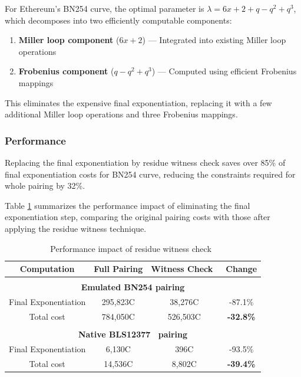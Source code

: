 For Ethereum's BN254 curve, the optimal parameter is $\lambda = 6x + 2 + q - q^2 + q^3$, which decomposes into two efficiently computable components:

\begin{enumerate}
\item \textbf{Miller loop component} ($6x + 2$) --- Integrated into existing Miller loop operations
\item \textbf{Frobenius component} ($q - q^2 + q^3$) --- Computed using efficient Frobenius mappings
\end{enumerate}

This eliminates the expensive final exponentiation, replacing it with a few additional Miller loop operations and three Frobenius mappings.

\subsubsection{Performance}

Replacing the final exponentiation by residue witness check saves over 85\% of final exponentiation costs for BN254 curve, reducing the constraints required for whole pairing by 32\%.

Table \ref{tab:pairing_performance} summarizes the performance impact of eliminating the final exponentiation step, comparing the original pairing costs with those after applying the residue witness technique.

\begin{table}[h]
\centering
\caption{Performance impact of residue witness check~\cite{OPP24}}
\label{tab:pairing_performance}
\begin{tabular}{|c|c|c|c|}
\hline
\textbf{Computation} & \textbf{Full Pairing} & \textbf{Witness Check~\cite{OPP24}} & \textbf{Change} \\
\hline
\multicolumn{4}{|c|}{} \\
\multicolumn{4}{|c|}{\textbf{Emulated BN254 pairing}} \\
\hline
Final Exponentiation & 295,823C & 38,276C & -87.1\% \\
\hline
Total cost & 784,050C & 526,503C & \textbf{-32.8\%} \\
\hline
\multicolumn{4}{|c|}{} \\
\multicolumn{4}{|c|}{\textbf{Native BLS12377~\cite{sf2c22} pairing}} \\
\hline
Final Exponentiation & 6,130C & 396C & -93.5\% \\
\hline
Total cost & 14,536C & 8,802C & \textbf{-39.4\%} \\
\hline
\end{tabular}
\end{table}
